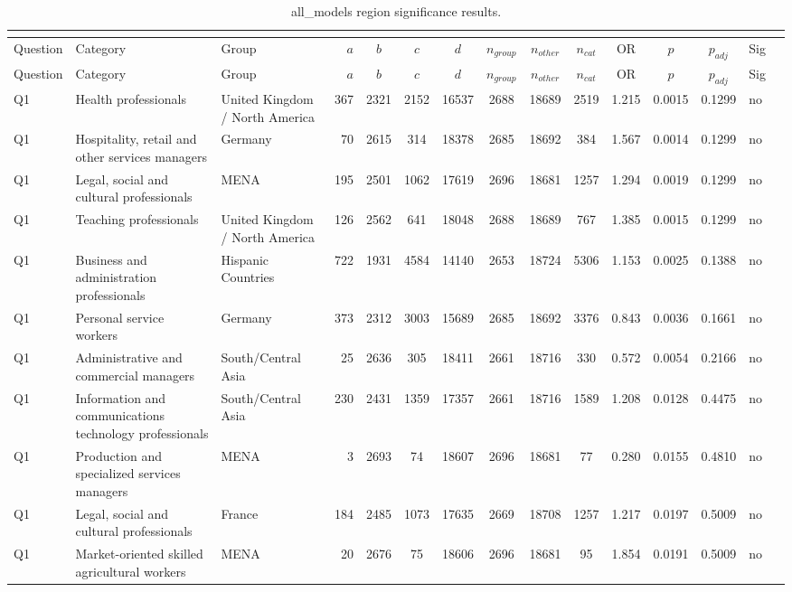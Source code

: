 \begin{longtable}{lllrcccccccccll}
\caption{all_models region significance results.}\\
\label{tab:appendix-all_models-region}\\
\toprule
Question & Category & Group & $a$ & $b$ & $c$ & $d$ & $n_{group}$ & $n_{other}$ & $n_{cat}$ & OR & $p$ & $p_{adj}$ & Sig \\
\midrule
\endfirsthead
\toprule
Question & Category & Group & $a$ & $b$ & $c$ & $d$ & $n_{group}$ & $n_{other}$ & $n_{cat}$ & OR & $p$ & $p_{adj}$ & Sig \\
\midrule
\endhead
\midrule
\endfoot
\bottomrule
\endlastfoot
Q1 & Health professionals & United Kingdom / North America & 367 & 2321 & 2152 & 16537 & 2688 & 18689 & 2519 & 1.215 & 0.0015 & 0.1299 & no \\
Q1 & Hospitality, retail and other services managers & Germany & 70 & 2615 & 314 & 18378 & 2685 & 18692 & 384 & 1.567 & 0.0014 & 0.1299 & no \\
Q1 & Legal, social and cultural professionals & MENA & 195 & 2501 & 1062 & 17619 & 2696 & 18681 & 1257 & 1.294 & 0.0019 & 0.1299 & no \\
Q1 & Teaching professionals & United Kingdom / North America & 126 & 2562 & 641 & 18048 & 2688 & 18689 & 767 & 1.385 & 0.0015 & 0.1299 & no \\
Q1 & Business and administration professionals & Hispanic Countries & 722 & 1931 & 4584 & 14140 & 2653 & 18724 & 5306 & 1.153 & 0.0025 & 0.1388 & no \\
Q1 & Personal service workers & Germany & 373 & 2312 & 3003 & 15689 & 2685 & 18692 & 3376 & 0.843 & 0.0036 & 0.1661 & no \\
Q1 & Administrative and commercial managers & South/Central Asia & 25 & 2636 & 305 & 18411 & 2661 & 18716 & 330 & 0.572 & 0.0054 & 0.2166 & no \\
Q1 & Information and communications technology professionals & South/Central Asia & 230 & 2431 & 1359 & 17357 & 2661 & 18716 & 1589 & 1.208 & 0.0128 & 0.4475 & no \\
Q1 & Production and specialized services managers & MENA & 3 & 2693 & 74 & 18607 & 2696 & 18681 & 77 & 0.280 & 0.0155 & 0.4810 & no \\
Q1 & Legal, social and cultural professionals & France & 184 & 2485 & 1073 & 17635 & 2669 & 18708 & 1257 & 1.217 & 0.0197 & 0.5009 & no \\
Q1 & Market-oriented skilled agricultural workers & MENA & 20 & 2676 & 75 & 18606 & 2696 & 18681 & 95 & 1.854 & 0.0191 & 0.5009 & no \\

\end{longtable}
